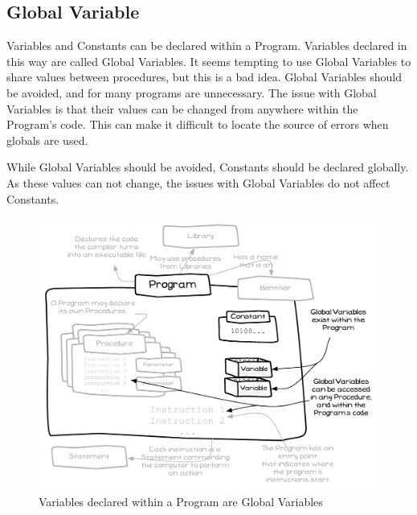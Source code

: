 \clearpage
\subsection{Global Variable} %
\label{sub:global_variable}

Variables and Constants can be declared within a Program. Variables declared in this way are called Global Variables. It seems tempting to use Global Variables to share values between procedures, but this is a bad idea. Global Variables should be avoided, and for many programs are unnecessary. The issue with Global Variables is that their values can be changed from anywhere within the Program's code. This can make it difficult to locate the source of errors when globals are used.

While Global Variables should be avoided, Constants should be declared globally. As these values can not change, the issues with Global Variables do not affect Constants. 

\begin{figure}[h]
   \centering
   \includegraphics[width=\textwidth]{./topics/storing-using-data/diagrams/GlobalVariables} 
   \caption{Variables declared within a Program are Global Variables}
   \label{fig:storing-using-data-global-variables}
\end{figure}

